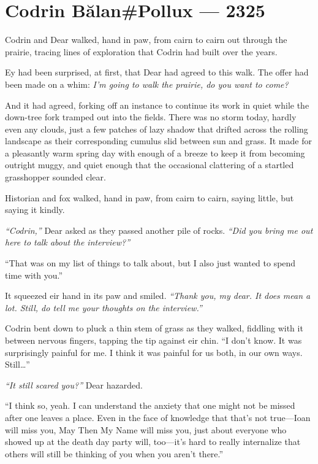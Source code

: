 \hypertarget{codrin-bux103lanpollux-2325}{%
\chapter{Codrin Bălan\#Pollux — 2325}\label{codrin-bux103lanpollux-2325}}

Codrin and Dear walked, hand in paw, from cairn to cairn out through the prairie, tracing lines of exploration that Codrin had built over the years.

Ey had been surprised, at first, that Dear had agreed to this walk. The offer had been made on a whim: \emph{I'm going to walk the prairie, do you want to come?}

And it had agreed, forking off an instance to continue its work in quiet while the down-tree fork tramped out into the fields. There was no storm today, hardly even any clouds, just a few patches of lazy shadow that drifted across the rolling landscape as their corresponding cumulus slid between sun and grass. It made for a pleasantly warm spring day with enough of a breeze to keep it from becoming outright muggy, and quiet enough that the occasional clattering of a startled grasshopper sounded clear.

Historian and fox walked, hand in paw, from cairn to cairn, saying little, but saying it kindly.

\emph{``Codrin,''} Dear asked as they passed another pile of rocks. \emph{``Did you bring me out here to talk about the interview?''}

``That was on my list of things to talk about, but I also just wanted to spend time with you.''

It squeezed eir hand in its paw and smiled. \emph{``Thank you, my dear. It does mean a lot. Still, do tell me your thoughts on the interview.''}

Codrin bent down to pluck a thin stem of grass as they walked, fiddling with it between nervous fingers, tapping the tip against eir chin. ``I don't know. It was surprisingly painful for me. I think it was painful for us both, in our own ways. Still\ldots{}''

\emph{``It still scared you?''} Dear hazarded.

``I think so, yeah. I can understand the anxiety that one might not be missed after one leaves a place. Even in the face of knowledge that that's not true---Ioan will miss you, May Then My Name will miss you, just about everyone who showed up at the death day party will, too---it's hard to really internalize that others will still be thinking of you when you aren't there.''

